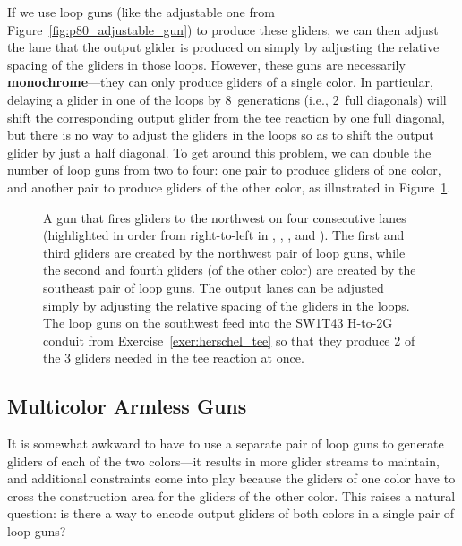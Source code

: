 If we use loop guns (like the adjustable one from Figure~\ref{fig:p80_adjustable_gun}) to produce these gliders, we can then adjust the lane that the output glider is produced on simply by adjusting the relative spacing of the gliders in those loops. However, these guns are necessarily \textbf{monochrome}---they can only produce gliders of a single color. In particular, delaying a glider in one of the loops by $8$~generations (i.e., 2~full diagonals) will shift the corresponding output glider from the tee reaction by one full diagonal, but there is no way to adjust the gliders in the loops so as to shift the output glider by just a half diagonal. To get around this problem, we can double the number of loop guns from two to four: one pair to produce gliders of one color, and another pair to produce gliders of the other color, as illustrated in Figure~\ref{fig:armless_4_lane_monochrome_gun}.


\begin{figure}[!htb]
	\centering
	\caption{A gun that fires gliders to the northwest on four consecutive lanes (highlighted in order from right-to-left in , , , and ). The first and third gliders are created by the northwest pair of loop guns, while the second and fourth gliders (of the other color) are created by the southeast pair of loop guns. The output lanes can be adjusted simply by adjusting the relative spacing of the gliders in the loops. The loop guns on the southwest feed into the SW1T43 H-to-2G conduit from Exercise~\ref{exer:herschel_tee} so that they produce 2 of the 3 gliders needed in the tee reaction at once.}\label{fig:armless_4_lane_monochrome_gun}
\end{figure}


\subsection{Multicolor Armless Guns}\label{sec:multicolor_armless_guns}

It is somewhat awkward to have to use a separate pair of loop guns to generate gliders of each of the two colors---it results in more glider streams to maintain, and additional constraints come into play because the gliders of one color have to cross the construction area for the gliders of the other color. This raises a natural question: is there a way to encode output gliders of both colors in a single pair of loop guns?

